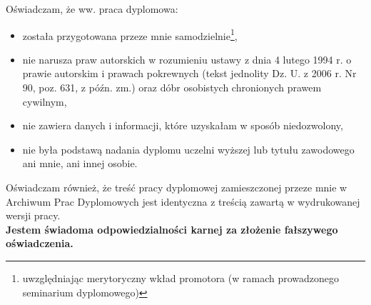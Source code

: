 \begin{titlepage}
\begin{small}
    \noindent Oświadczam, że ww. praca dyplomowa:
    \begin{itemize}
    \item została przygotowana przeze mnie samodzielnie\footnote{\scriptsize uwzględniając merytoryczny wkład promotora (w ramach prowadzonego seminarium dyplomowego)},
    \item nie narusza praw autorskich w rozumieniu ustawy z dnia 4 lutego 1994 r. o prawie autorskim i prawach pokrewnych (tekst jednolity Dz. U. z 2006 r. Nr 90, poz. 631, z późn. zm.) oraz dóbr osobistych chronionych prawem cywilnym,
    \item nie zawiera danych i informacji, które uzyskałam w sposób niedozwolony,
    \item nie była podstawą nadania dyplomu uczelni wyższej lub tytułu zawodowego ani mnie, ani innej osobie.
    \end{itemize}
    \vskip 0.5cm
    Oświadczam również, że treść pracy dyplomowej zamieszczonej przeze mnie w Archiwum Prac Dyplomowych jest identyczna z treścią zawartą w wydrukowanej wersji pracy.\\[0.5cm]
    \textbf{Jestem świadoma odpowiedzialności karnej za złożenie fałszywego oświadczenia.}\\[1cm]
    
    \footnotesize{\parbox{4cm}{\dotfill{}}\hfill\parbox{5cm}{\dotfill{}}}
    \end{small}
    \end{titlepage}
\fi
